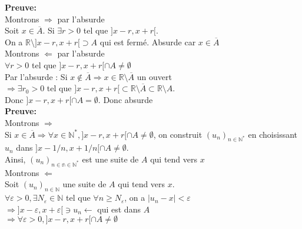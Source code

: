 \documentclass{article}
\begin{document}
\noindent\textbf{Preuve:}\\
Montrons $\Rightarrow$ par l'absurde\\
\indent Soit \(x\in \overline{A}\). Si \(\exists r>0\) tel que \(]x-r, x+r[\).\\
\indent On a $\mathbb{R}\setminus ]x-r, x+r[ \supset A$ qui est fermé. Absurde car $x\in \overline{A}$\\
Montrons $\Leftarrow$ par l'absurde\\
\indent $\forall r>0$ tel que $]x-r, x+r[\cap A\ne \emptyset $\\
\indent Par l'absurde : Si $x\notin \overline{A}\Rightarrow x\in \mathbb{R}\setminus \overline{A}$ un ouvert \\
\indent\indent\indent\indent\indent\indent\indent\indent 
$\Rightarrow \exists r_0 >0$ tel que $]x-r, x+r[\subset\mathbb{R}\setminus\overline{A}\subset \mathbb{R}\setminus A$.\\
\indent Donc $]x-r, x+r[\cap A=\emptyset$. Donc absurde\\

\noindent\textbf{Preuve:}\\
Montrons $\Rightarrow$\\
\indent Si $x\in\overline{A}\Rightarrow \forall x\in \mathbb{N}^* , ]x-r,x+r[\cap A\ne \emptyset$, on construit $(u_n)_{n\in \mathbb{N}^*}$ en choisissant $u_n$ dans $]x-1/n, x+1/n[\cap A\ne \emptyset$.\\
\indent Ainsi, $(u_n)_{n\in \mathbb{n\in \mathbb{N}^*}}$ est une suite de $A$ qui tend vers $x$\\
Montrons $\Leftarrow$\\
\indent Soit $(u_n)_{n\in \mathbb{N}}$ une suite de $A$ qui tend vers $x$.\\
\indent $\forall \varepsilon >0, \exists N_\varepsilon \in \mathbb{N}$ tel que $ \forall n\ge N_\varepsilon$, on a $|u_n-x|<\varepsilon$\\
\indent  \indent \indent 
$\Rightarrow ]x-\varepsilon, x+\varepsilon[\ni u_n \leftarrow $ qui est dans $A$\\
\indent  \indent \indent 
$\Rightarrow \forall \varepsilon>0, ]x-r, x+r[\cap A \ne \emptyset$\\
\end{document}
